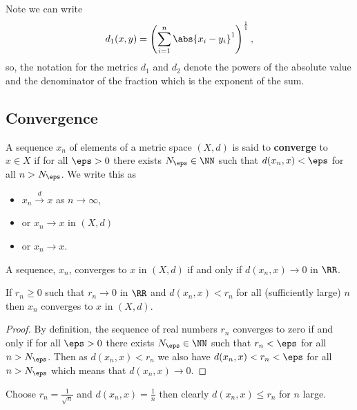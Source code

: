 \documentclass[12pt, a4paper]{article}
\begin{document}
\begin{mdnote}
    Note we can write 
    \[d_1(x,y) = \left( \sum_{i=1}^{n} \abs{x_i-y_i}^1 \right)^{\frac{1}{1}},\]
    so, the notation for the metrics \(d_1\) and \(d_2\) denote the powers of the absolute value and the denominator of the fraction which is the exponent of the sum.
\end{mdnote}

\subsection{Convergence}

\begin{definition}
    A sequence \(x_n\) of elements of a metric space \((X,d)\) is said to \textbf{converge} to \(x \in X\) if for all \(\eps>0\) there exists \(N_{\eps} \in \NN\) such that \(d(x_n,x) < \eps\) for all \(n > N_{\eps}\).
    We write this as 
    \begin{itemize}
        \item \(x_n \xrightarrow{d} x\) as \(n \to \infty\), 
        \item or \(x_n \to x\) in \((X,d)\) 
        \item or \(x_n \to x\).
    \end{itemize}
\end{definition}

\begin{mdlemma}
    A sequence, \(x_n\), converges to \(x\) in \((X,d)\) if and only if \(d(x_n,x) \to 0\) in \(\RR\).
\end{mdlemma}

\begin{lemma}
    If \(r_n \geq 0\) such that \(r_n \to 0\) in \(\RR\) and \(d(x_n,x) < r_n\) for all (sufficiently large) \(n\) then \(x_n\) converges to \(x\) in \((X,d)\).
\end{lemma}

\begin{proof}
    By definition, the sequence of real numbers \(r_n\) converges to zero if and only if for all \(\eps>0\) there exists \(N_{\eps} \in \NN\) such that \(r_n <\eps\) for all \(n >N_{\eps}\). Then as \(d(x_n,x)<r_n\) we also have \(d(x_n,x)<r_n<\eps\) for all \(n >N_{\eps}\) which means that \(d(x_n, x) \to 0\).
\end{proof}

\begin{example}
    Choose \(r_n = \frac{1}{\sqrt{n}}\) and \(d(x_n,x)=\frac{1}{n}\) then clearly \(d(x_n,x) \leq r_n\) for \(n\) large.
\end{example}
\end{document}
